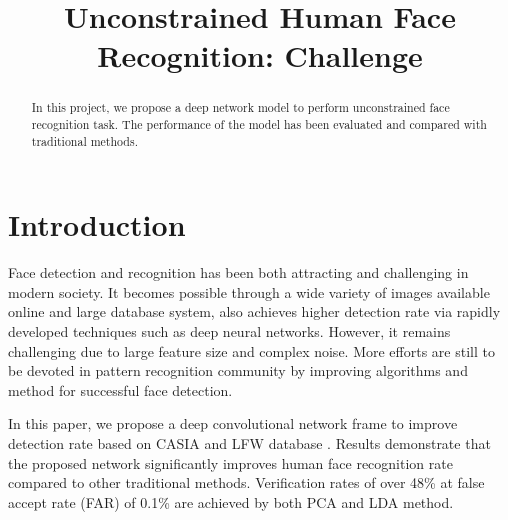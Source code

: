 \documentclass[conference]{IEEEtran}
\begin{document}
	\title{Unconstrained Human Face Recognition: Challenge}

	\author{
		\and
		}
	\maketitle


\begin{abstract}

In this project, we propose a deep network model to perform unconstrained face recognition task. The performance of the model has been evaluated and compared with traditional methods.

\end{abstract}

\section{Introduction}

Face detection and recognition has been both attracting and challenging in modern society. It becomes possible through a wide variety of images available online and large database system, also achieves higher detection rate via rapidly developed techniques such as deep neural networks. However, it remains challenging due to large feature size and complex noise. More efforts are still to be devoted in pattern recognition community by improving algorithms and method for successful face detection. 

In this paper, we propose a deep convolutional network frame to improve detection rate based on CASIA and LFW database \cite{LFWTech}. Results demonstrate that the proposed network significantly improves human face recognition rate compared to other traditional methods. Verification rates of over 48\% at false accept rate (FAR) of 0.1\% are achieved by both PCA and LDA method.
\end{document}
